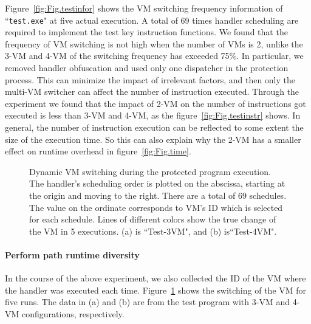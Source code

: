 \documentclass[preprint,12pt,3p]{elsarticle}
\begin{document}
Figure~\ref{fig:Fig.testinfor} shows the VM switching frequency information of ``\texttt{test.exe}" at five actual execution. A total of 69 times handler scheduling are required to implement the test key instruction functions.
We found that the frequency of VM switching is not high when the number of VMs is 2,
unlike the 3-VM and 4-VM of the switching frequency has exceeded 75\%.
In particular, we removed handler obfuscation and used only one dispatcher in the protection process.
This can minimize the impact of irrelevant factors, and then only the multi-VM switcher can affect the number of instruction executed.
Through the experiment we found that the impact of 2-VM on the number of instructions got executed is less than 3-VM and 4-VM,
as the figure~\ref{fig:Fig.testinstr} shows.
In general, the number of instruction execution can be reflected to some extent the size of the execution time.
So this can also explain why the 2-VM has a smaller effect on runtime overhead in figure~\ref{fig:Fig.time}.

\begin{figure}[t]
\centering
{}
\caption{Dynamic VM switching during the protected program execution. The handler's scheduling order is plotted on the abscissa, starting at the origin and moving to the right. There are a total of 69 schedules. The value on the ordinate corresponds to VM's ID which is selected for each schedule. Lines of different colors show the true change of the VM in 5 executions. (a) is ``Test-3VM", and (b) is``Test-4VM". }\label{fig:Fig.execvm}
\end{figure}

\paragraph*{Perform path runtime diversity}
In the course of the above experiment, we also collected the ID of the VM where the handler was executed each time.
Figure~\ref{fig:Fig.execvm} shows the switching of the VM for five runs.
The data in (a) and (b) are from the test program with 3-VM and 4-VM configurations, respectively.
\end{document}
